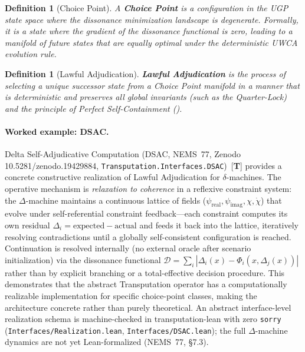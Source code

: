 \documentclass[12pt]{article}
\newtheorem{definition}[theorem]{Definition}
\newcommand{\PSC}{\text{PSC}}
\begin{document}
\begin{definition}[Choice Point]
\label{def:choice_point}
A \textbf{Choice Point} is a configuration in the UGP state space where the dissonance minimization landscape is degenerate. Formally, it is a state where the gradient of the dissonance functional is zero, leading to a manifold of future states that are equally optimal under the deterministic UWCA evolution rule.
\end{definition}

\begin{definition}[Lawful Adjudication]
\label{def:lawful_adjudication}
\textbf{Lawful Adjudication} is the process of selecting a unique successor state from a Choice Point manifold in a manner that is deterministic and preserves all global invariants (such as the Quarter-Lock) and the principle of Perfect Self-Containment (\PSC).
\end{definition}

\paragraph{Worked example: DSAC.}
Delta Self-Adjudicative Computation (DSAC, NEMS~77,
Zenodo 10.5281/\allowbreak zenodo.19429884,
\texttt{Transputation.Interfaces.DSAC})~[\textbf{T}] provides a concrete
constructive realization of Lawful Adjudication for $\delta$-machines.
The operative mechanism is \emph{relaxation to coherence} in a reflexive
constraint system: the $\Delta$-machine maintains a continuous lattice of
fields ($\psi_{\mathrm{real}},\psi_{\mathrm{imag}},\chi,\dot\chi$) that
evolve under self-referential constraint feedback---each constraint computes
its own residual $\Delta_i = \mathrm{expected} - \mathrm{actual}$ and feeds
it back into the lattice, iteratively resolving contradictions until a globally
self-consistent configuration is reached.
Continuation is resolved internally (no external oracle after scenario
initialization) via the dissonance functional
$\mathcal{D} = \sum_i |\Delta_i(x) - \Phi_i(x,\Delta_j(x))|$
rather than by explicit branching or a total-effective decision procedure.
This demonstrates that the abstract Transputation operator has a
computationally realizable implementation for specific choice-point
classes, making the architecture concrete rather than purely theoretical.
An abstract interface-level realization schema is machine-checked in
transputation-lean with zero \texttt{sorry}
(\texttt{Interfaces/Realization.lean}, \texttt{Interfaces/DSAC.lean});
the full $\Delta$-machine dynamics are not yet Lean-formalized (NEMS~77,
\S7.3).
\end{document}
